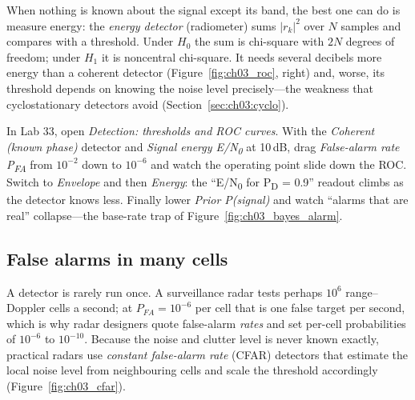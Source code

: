 When nothing is known about the signal except its band, the best one can do is measure energy: the
\emph{energy detector} (radiometer) sums $|r_k|^2$ over $N$ samples and compares with a threshold. Under
$H_0$ the sum is chi-square with $2N$ degrees of freedom; under $H_1$ it is noncentral chi-square. It needs
several decibels more energy than a coherent detector (Figure~\ref{fig:ch03_roc}, right) and, worse, its
threshold depends on knowing the noise level precisely---the weakness that cyclostationary detectors avoid
(Section~\ref{sec:ch03:cyclo}).


\begin{tryit}
In Lab 33, open \emph{Detection: thresholds and ROC curves}. With the \emph{Coherent (known phase)} detector
and \emph{Signal energy E/N\textsubscript{0}} at 10\,dB, drag \emph{False-alarm rate P\textsubscript{FA}}
from $10^{-2}$ down to $10^{-6}$ and watch the operating point slide down the ROC. Switch to
\emph{Envelope} and then \emph{Energy}: the ``E/N\textsubscript{0} for P\textsubscript{D} = 0.9'' readout
climbs as the detector knows less. Finally lower \emph{Prior P(signal)} and watch ``alarms that are real''
collapse---the base-rate trap of Figure~\ref{fig:ch03_bayes_alarm}.
\end{tryit}

\subsection{False alarms in many cells}

A detector is rarely run once. A surveillance radar tests perhaps $10^6$ range--Doppler cells a second; at
$P_{FA}=10^{-6}$ per cell that is one false target per second, which is why radar designers quote
false-alarm \emph{rates} and set per-cell probabilities of $10^{-6}$ to $10^{-10}$. Because the noise and
clutter level is never known exactly, practical radars use \emph{constant false-alarm rate} (CFAR)
detectors that estimate the local noise level from neighbouring cells and scale the threshold accordingly
(Figure~\ref{fig:ch03_cfar}).

